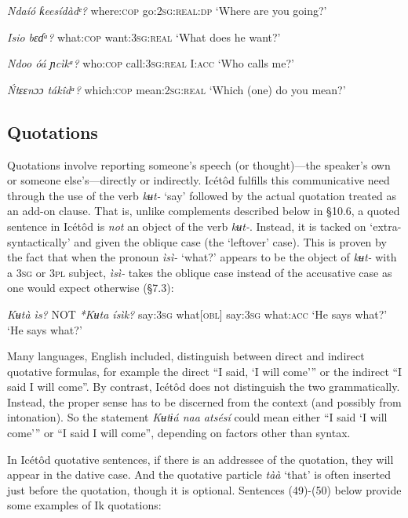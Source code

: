 \begin{table}
\textit{Ndaíó   ƙeesídàdᵉ?}
where:\textsc{cop}   go:\textsc{2sg:real:dp}
‘Where are you going?’




\textit{Isio     bɛɗᵃ?}
what:\textsc{cop}   want:\textsc{3sg:real}
‘What does he want?’




\textit{Ndoo     óá       ɲcìkᵃ?}
who:\textsc{cop}   call:\textsc{3sg:real}   I:\textsc{acc}
‘Who calls me?’




\textit{\'{N}tɛɛnɔɔ   tákîdᵃ?}
which:\textsc{cop}   mean:\textsc{2sg:real}
‘Which (one) do you mean?’






\subsection{Quotations}


Quotations involve reporting someone’s speech (or thought)—the speaker’s own or someone else’s—directly or indirectly. Icétôd fulfills this communicative need through the use of the verb \textit{kʉt- }‘say’ followed by the actual quotation treated as an add-on clause. That is, unlike complements described below in §10.6, a quoted sentence in Icétôd is \textit{not} an object of the verb \textit{kʉt-}. Instead, it is tacked on ‘extra-syntactically’ and given the oblique case (the ‘leftover’ case). This is proven by the fact that when the pronoun \textit{ìsì- }‘what?’ appears to be the object of \textit{kʉt-} with a \textsc{3sg} or \textsc{3pl} subject, \textit{ìsì- }takes the oblique case instead of the accusative case as one would expect otherwise (§7.3):




\textit{Kʉtà     ìs?}    NOT  \textit{*Kʉta   ísìk?}
say:\textsc{3sg}   what[\textsc{obl}]    say:\textsc{3sg}   what:\textsc{acc}
‘He says what?’      ‘He says what?’


Many languages, English included, distinguish between direct and indirect quotative formulas, for example the direct “I said, ‘I will come’” or the indirect “I said I will come”. By contrast, Icétôd does not distinguish the two grammatically. Instead, the proper sense has to be discerned from the context (and possibly from intonation). So the statement \textit{Kʉtɨá naa atsésí }could mean either “I said ‘I will come’” or “I said I will come”, depending on factors other than syntax. 

In Icétôd quotative sentences, if there is an addressee of the quotation, they will appear in the dative case. And the quotative particle \textit{tàà }‘that’ is often inserted just before the quotation, though it is optional. Sentences (49)-(50) below provide some examples of Ik quotations:




\end{table}
